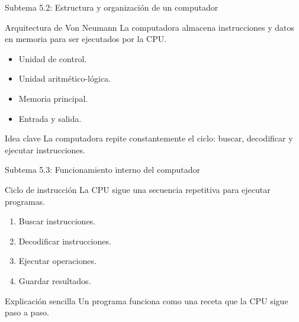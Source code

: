 \documentclass[10pt,aspectratio=169]{beamer}
\begin{document}
	\begin{frame}{Subtema 5.2: Estructura y organización de un computador}
		
		\small
		
		\begin{block}{Arquitectura de Von Neumann}
			La computadora almacena instrucciones y datos en memoria para ser ejecutados por la CPU.
		\end{block}
		
		\begin{itemize}
			\item Unidad de control.
			\item Unidad aritmético-lógica.
			\item Memoria principal.
			\item Entrada y salida.
		\end{itemize}
		
		\begin{block}{Idea clave}
			La computadora repite constantemente el ciclo:
			buscar, decodificar y ejecutar instrucciones.
		\end{block}
		
	\end{frame}
	
	
	\begin{frame}{Subtema 5.3: Funcionamiento interno del computador}
		
		\small
		
		\begin{block}{Ciclo de instrucción}
			La CPU sigue una secuencia repetitiva para ejecutar programas.
		\end{block}
		
		\begin{enumerate}
			\item Buscar instrucciones.
			\item Decodificar instrucciones.
			\item Ejecutar operaciones.
			\item Guardar resultados.
		\end{enumerate}
		
		\begin{block}{Explicación sencilla}
			Un programa funciona como una receta que la CPU sigue paso a paso.
		\end{block}
		
	\end{frame}
	
\end{document}
